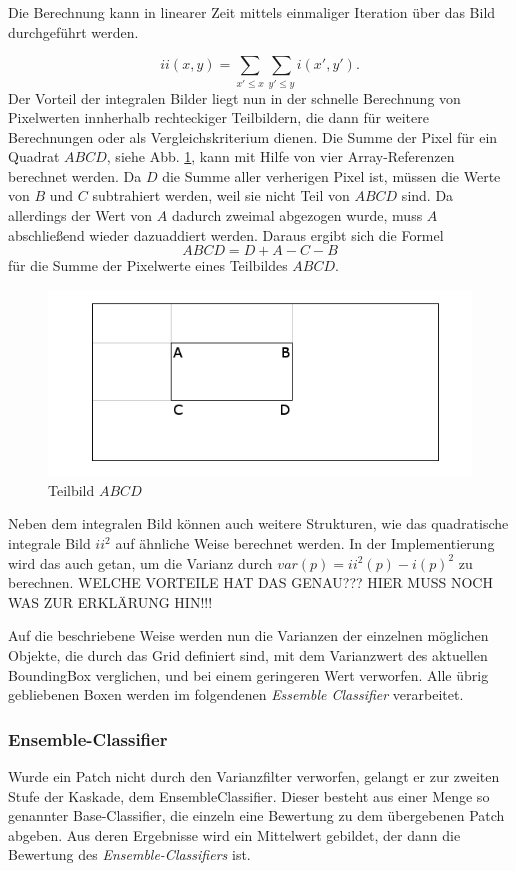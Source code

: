 	Die Berechnung kann in linearer Zeit mittels einmaliger Iteration über das Bild durchgeführt werden.

	$$ ii(x,y)=\underset{x'\leq x}{\sum}\underset{y'\leq y}{\sum}i(x',y'). $$
	Der Vorteil der integralen Bilder liegt nun in der schnelle Berechnung von Pixelwerten innherhalb rechteckiger Teilbildern, die dann für weitere Berechnungen oder als Vergleichskriterium dienen. Die Summe der Pixel für ein Quadrat $ABCD$, siehe Abb. \ref{Subwindow}, kann mit Hilfe von vier Array-Referenzen berechnet werden. Da $D$ die Summe aller verherigen Pixel ist, müssen die Werte von $B$ und $C$ subtrahiert werden, weil sie nicht Teil von $ABCD$ sind. Da allerdings der Wert von $A$ dadurch zweimal abgezogen wurde, muss $A$ abschließend wieder dazuaddiert werden. Daraus ergibt sich die Formel $$ABCD=D+A-C-B$$ für die Summe der Pixelwerte eines Teilbildes $ABCD$.

	\begin{figure}
	\centering{}\includegraphics[scale=0.7]{../pictures/IntegralImage.png}\caption{Teilbild $ABCD$}
	\label{Subwindow}
	\end{figure}

	Neben dem integralen Bild können auch weitere Strukturen, wie das quadratische integrale Bild $ii^{2}$ auf ähnliche Weise berechnet werden. In der Implementierung wird das auch getan, um die Varianz durch $var(p)=ii^{2}(p)-i(p)^{2}$ zu berechnen. WELCHE VORTEILE HAT DAS GENAU??? HIER MUSS NOCH WAS ZUR ERKLÄRUNG HIN!!! 

	Auf die beschriebene Weise werden nun die Varianzen der einzelnen möglichen Objekte, die durch das Grid definiert sind, mit dem Varianzwert des aktuellen BoundingBox verglichen, und bei einem geringeren Wert verworfen. Alle übrig gebliebenen Boxen werden im folgendenen \textit{Essemble Classifier} verarbeitet.

	\subsubsection{Ensemble-Classifier}
	Wurde ein Patch nicht durch den Varianzfilter verworfen, gelangt er zur zweiten Stufe der Kaskade, dem EnsembleClassifier. Dieser besteht aus einer Menge so genannter Base-Classifier, die einzeln eine Bewertung zu dem übergebenen Patch abgeben. Aus deren Ergebnisse wird ein Mittelwert gebildet, der dann die Bewertung des \textit{Ensemble-Classifiers} ist.

